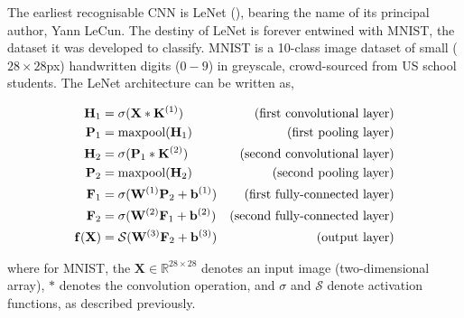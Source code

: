 The earliest recognisable CNN is LeNet (\cite{lecun1998gradient}), bearing the name of its principal author, Yann LeCun. The destiny of LeNet is forever entwined with MNIST, the dataset it was developed to classify. MNIST is a 10-class image dataset of small ($28\times28$px) handwritten digits ($0-9$) in greyscale, crowd-sourced from US school students. The LeNet architecture can be written as,

\begin{align}
\mathbf{H}_1 &= \sigma(\mathbf{X} * \mathbf{K}^{(1)}) & \text{(first convolutional layer)}\notag \\
\mathbf{P}_1 &= \text{maxpool}(\mathbf{H}_1) & \text{(first pooling layer)}\notag \\
\mathbf{H}_2 &= \sigma(\mathbf{P}_1 * \mathbf{K}^{(2)}) & \text{(second convolutional layer)} \notag \\
\mathbf{P}_2 &= \text{maxpool}(\mathbf{H}_2) & \text{(second pooling layer)} \notag \\
\mathbf{F}_1 &= \sigma(\mathbf{W}^{(1)}\mathbf{P}_2 + \mathbf{b}^{(1)}) & \text{(first fully-connected layer)} \notag \\
\mathbf{F}_2 &= \sigma(\mathbf{W}^{(2)}\mathbf{F}_1 + \mathbf{b}^{(2)}) & \text{(second fully-connected layer)} \notag \\
\mathbf{f}(\mathbf{X}) &= \mathcal{S}(\mathbf{W}^{(3)}\mathbf{F}_2 + \mathbf{b}^{(3)}) & \text{(output layer)}
\end{align}

where for MNIST, the $\mathbf{X} \in \mathbb{R}^{28\times28}$ denotes an input image (two-dimensional array), $*$ denotes the convolution operation, and $\sigma$ and $\mathcal{S}$ denote  activation functions, as described previously. 

